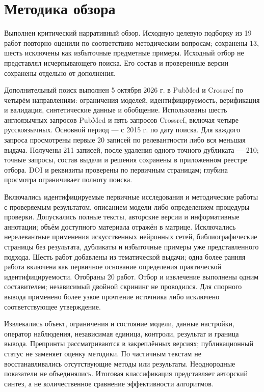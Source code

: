 \documentclass[12pt,a4paper]{article}
\begin{document}
\section*{Методика обзора}
Выполнен критический нарративный обзор. Исходную целевую подборку из 19 работ повторно оценили по соответствию методическим вопросам; сохранены 13, шесть исключены как избыточные предметные примеры. Исходный отбор не представлял исчерпывающего поиска. Его состав и проверенные версии сохранены отдельно от дополнения.\par
Дополнительный поиск выполнен 5 октября 2026 г. в PubMed и Crossref по четырём направлениям: ограничения моделей, идентифицируемость, верификация и валидация, синтетические данные и обобщение. Использованы шесть англоязычных запросов PubMed и пять запросов Crossref, включая четыре русскоязычных. Основной период — с 2015 г. по дату поиска. Для каждого запроса просмотрены первые 20 записей по релевантности либо вся меньшая выдача. Получены 211 записей, после удаления одного точного дубликата — 210; точные запросы, состав выдачи и решения сохранены в приложенном реестре отбора. DOI и реквизиты проверены по первичным страницам; глубина просмотра ограничивает полноту поиска.\par
Включались идентифицируемые первичные исследования и методические работы с проверяемым результатом, описанием модели либо определением процедуры проверки. Допускались полные тексты, авторские версии и информативные аннотации; объём доступного материала отражён в матрице. Исключались нерелевантные применения искусственных нейронных сетей, библиографические страницы без результата, дубликаты и избыточные примеры уже представленного подхода. Шесть работ добавлены из тематической выдачи; одна более ранняя работа включена как первичное основание определения практической идентифицируемости. Отобраны 20 работ. Отбор и извлечение выполнены одним составителем; независимый двойной скрининг не проводился. Для спорного вывода применено более узкое прочтение источника либо исключено соответствующее утверждение.\par
Извлекались объект, ограничения и состояние модели, данные настройки, оператор наблюдения, независимая единица, контроли, результат и граница вывода. Препринты рассматриваются в закреплённых версиях; публикационный статус не заменяет оценку методики. По частичным текстам не восстанавливались отсутствующие методы или результаты. Неоднородные показатели не объединялись. Итоговая классификация представляет авторский синтез, а не количественное сравнение эффективности алгоритмов.\par
\end{document}
